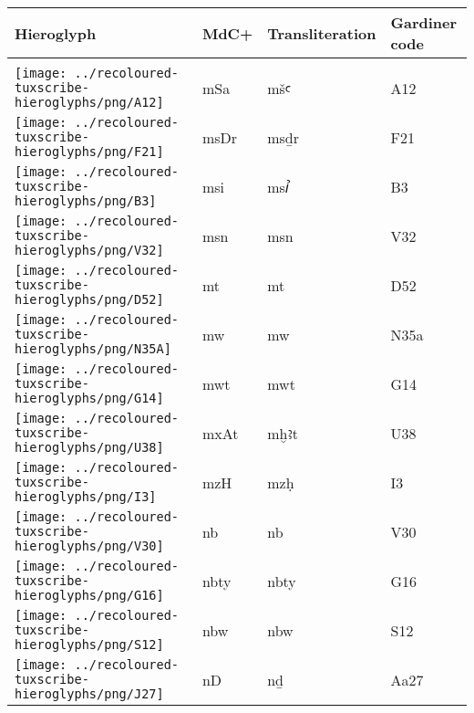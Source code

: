 \begin{center}
	\begin{tabularx}{\linewidth}{YYYY}
		Hieroglyph & MdC+ & Transliteration & Gardiner code\\
		\hline\\
		\texttt{[image: ../recoloured-tuxscribe-hieroglyphs/png/A12]} & mSa & mšꜥ & A12 \\ 
		\texttt{[image: ../recoloured-tuxscribe-hieroglyphs/png/F21]} & msDr & msḏr & F21 \\ 
		\texttt{[image: ../recoloured-tuxscribe-hieroglyphs/png/B3]} & msi & msꞽ & B3 \\ 
		\texttt{[image: ../recoloured-tuxscribe-hieroglyphs/png/V32]} & msn & msn & V32 \\ 
		\texttt{[image: ../recoloured-tuxscribe-hieroglyphs/png/D52]} & mt & mt & D52 \\ 
		\texttt{[image: ../recoloured-tuxscribe-hieroglyphs/png/N35A]} & mw & mw & N35a \\ 
		\texttt{[image: ../recoloured-tuxscribe-hieroglyphs/png/G14]} & mwt & mwt & G14 \\ 
		\texttt{[image: ../recoloured-tuxscribe-hieroglyphs/png/U38]} & mxAt & mḫꜣt & U38 \\ 
		\texttt{[image: ../recoloured-tuxscribe-hieroglyphs/png/I3]} & mzH & mzḥ & I3 \\ 
		\texttt{[image: ../recoloured-tuxscribe-hieroglyphs/png/V30]} & nb & nb & V30 \\ 
		\texttt{[image: ../recoloured-tuxscribe-hieroglyphs/png/G16]} & nbty & nbty & G16 \\ 
		\texttt{[image: ../recoloured-tuxscribe-hieroglyphs/png/S12]} & nbw & nbw & S12 \\ 
		\texttt{[image: ../recoloured-tuxscribe-hieroglyphs/png/J27]} & nD & nḏ & Aa27 \\ 
	\end{tabularx}
\end{center}


